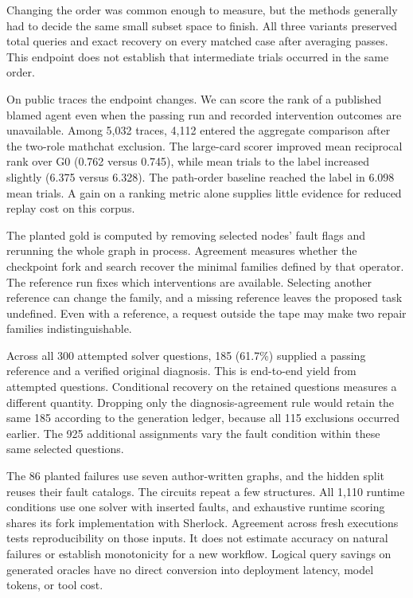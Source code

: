 \documentclass[11pt,letterpaper]{article}
\begin{document}
Changing the order was common enough to measure, but the methods generally had to decide the same small subset space to finish. All three variants preserved total queries and exact recovery on every matched case after averaging passes. This endpoint does not establish that intermediate trials occurred in the same order.

On public traces the endpoint changes. We can score the rank of a published blamed agent even when the passing run and recorded intervention outcomes are unavailable. Among 5,032 traces, 4,112 entered the aggregate comparison after the two-role mathchat exclusion. The large-card scorer improved mean reciprocal rank over G0 (0.762 versus 0.745), while mean trials to the label increased slightly (6.375 versus 6.328). The path-order baseline reached the label in 6.098 mean trials. A gain on a ranking metric alone supplies little evidence for reduced replay cost on this corpus.



The planted gold is computed by removing selected nodes' fault flags and rerunning the whole graph in process. Agreement measures whether the checkpoint fork and search recover the minimal families defined by that operator. The reference run fixes which interventions are available. Selecting another reference can change the family, and a missing reference leaves the proposed task undefined. Even with a reference, a request outside the tape may make two repair families indistinguishable.

Across all 300 attempted solver questions, 185 (61.7\%) supplied a passing reference and a verified original diagnosis. This is end-to-end yield from attempted questions. Conditional recovery on the retained questions measures a different quantity. Dropping only the diagnosis-agreement rule would retain the same 185 according to the generation ledger, because all 115 exclusions occurred earlier. The 925 additional assignments vary the fault condition within these same selected questions.

The 86 planted failures use seven author-written graphs, and the hidden split reuses their fault catalogs. The circuits repeat a few structures. All 1,110 runtime conditions use one solver with inserted faults, and exhaustive runtime scoring shares its fork implementation with Sherlock. Agreement across fresh executions tests reproducibility on those inputs. It does not estimate accuracy on natural failures or establish monotonicity for a new workflow. Logical query savings on generated oracles have no direct conversion into deployment latency, model tokens, or tool cost.
\end{document}
